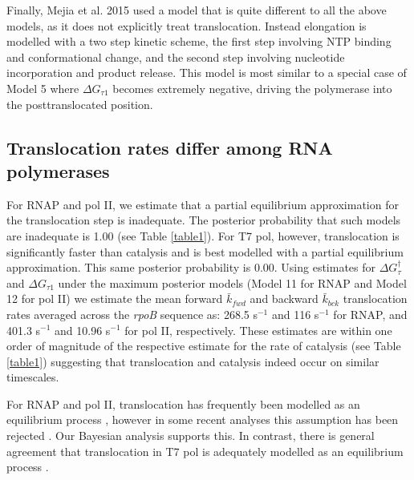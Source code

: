 \documentclass[10pt,letterpaper]{article}
\begin{document}
Finally, Mejia et al. 2015 \cite{mejia2015trigger} used a model that is quite different to all the above models, as it does not explicitly treat translocation. Instead elongation is modelled with a two step kinetic scheme, the first step involving NTP binding and conformational change, and the second step involving nucleotide incorporation and product release. This model is most similar to a special case of Model 5 where $\Delta G_{\tau 1}$ becomes extremely negative, driving the polymerase into the posttranslocated position.  



\subsection*{Translocation rates differ among RNA polymerases} For RNAP and pol II, we estimate that a partial equilibrium approximation for the translocation step is inadequate. The posterior probability that such models are inadequate is 1.00 (see Table \ref{table1}). For T7 pol, however, translocation is significantly faster than catalysis and is best modelled with a partial equilibrium approximation. This same posterior probability is 0.00. Using estimates for $\Delta G_\tau^\dag$ and $\Delta G_{\tau 1}$ under the maximum posterior models (Model 11 for RNAP and Model 12 for pol II) we estimate the mean forward $\bar{k}_{fwd}$ and backward $\bar{k}_{bck}$ translocation rates averaged across the {\it rpoB} sequence as:  268.5 s$^{-1}$ and 116 s$^{-1}$ for RNAP, and 401.3 s$^{-1}$ and 10.96 s$^{-1}$ for pol II, respectively. These estimates are within one order of magnitude of the respective estimate for the rate of catalysis (see Table \ref{table1}) suggesting that translocation and catalysis indeed occur on similar timescales.  \par

For RNAP and pol II, translocation has frequently been modelled as an equilibrium process \cite{abbondanzieri2005direct, bai2004sequence, mejia2015trigger, larson2012trigger, schweikhard2014transcription}, however in some recent analyses this assumption has been rejected \cite{tadigotla2006thermodynamic, maoileidigh2011unified, nedialkov2012rna, Dangkulwanich2013complete, kireeva2018rna}. Our Bayesian analysis supports this. In contrast, there is general agreement that translocation in T7 pol is adequately modelled as an equilibrium process \cite{guajardo1998ntp, arnold2001kinetic, thomen2008t7}. \par
\end{document}
